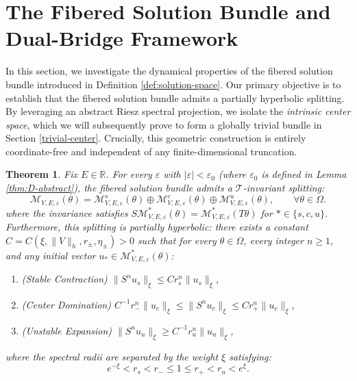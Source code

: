 \documentclass[reqno,11pt]{amsart}
\newtheorem{theorem}{Theorem}[section]
\newcommand{\R}{{\mathbb R}}
\begin{document}
   
\section{ The Fibered Solution Bundle and Dual-Bridge Framework}
\label{sec:ambient_framework}


In this section, we investigate the dynamical properties of the fibered solution bundle introduced in Definition \ref{def:solution-space}. Our primary objective is to establish that the fibered solution bundle admits a partially hyperbolic splitting. By leveraging an abstract Riesz spectral projection, we isolate the \emph{intrinsic center space}, which we will subsequently prove to form a globally trivial bundle in Section \ref{trivial-center}. Crucially, this geometric construction is entirely coordinate-free and independent of any finite-dimensional truncation.
\begin{theorem}
\label{thm:sec7final}
Fix $E\in\R$. For every $\varepsilon$ with $|\varepsilon|<\varepsilon_0$ (where $\varepsilon_0$ is defined in Lemma \ref{thm:D-abstract}), the fibered solution bundle admits a $\mathscr{T}$-invariant splitting:
$$
\mathcal{M}_{V,E,\varepsilon}(\theta)=
\mathcal{M}_{V,E,\varepsilon}^s(\theta)
\oplus\mathcal{M}_{V,E,\varepsilon}^c(\theta)
\oplus\mathcal{M}_{V,E,\varepsilon}^u(\theta),
\qquad \forall \theta\in\Omega.
$$
where the invariance satisfies $S \mathcal{M}_{V,E,\varepsilon}^\ast(\theta) = \mathcal{M}_{V,E,\varepsilon}^\ast(T\theta)$ for $\ast \in \{s, c, u\}$. Furthermore, this splitting is  partially hyperbolic: there exists a constant $C= C(\xi, \|V\|_h, r_\pm, \eta_\pm) > 0$ such that for every $\theta\in\Omega$, every integer $n \ge 1$, and any initial vector $u_\ast \in \mathcal{M}_{V,E,\varepsilon}^\ast(\theta)$:
\begin{enumerate}
    \item (Stable Contraction) \quad $\|S^n u_s\|_\xi \le C r_s^n \|u_s\|_\xi$,
    \item (Center Domination) \quad $C^{-1} r_{-}^n \|u_c\|_\xi \le \|S^n u_c\|_\xi \le C r_+^n \|u_c\|_\xi$,
    \item (Unstable Expansion) \quad $\|S^n u_u\|_\xi \ge C^{-1} r_u^n \|u_u\|_\xi$,
\end{enumerate}
where the spectral radii are separated by the  weight $\xi$ satisfying:
\begin{equation}\label{radius}
   e^{-\xi} < r_s < r_- \le 1 \le r_+ < r_u < e^\xi.
\end{equation}
\end{theorem}
\end{document}

